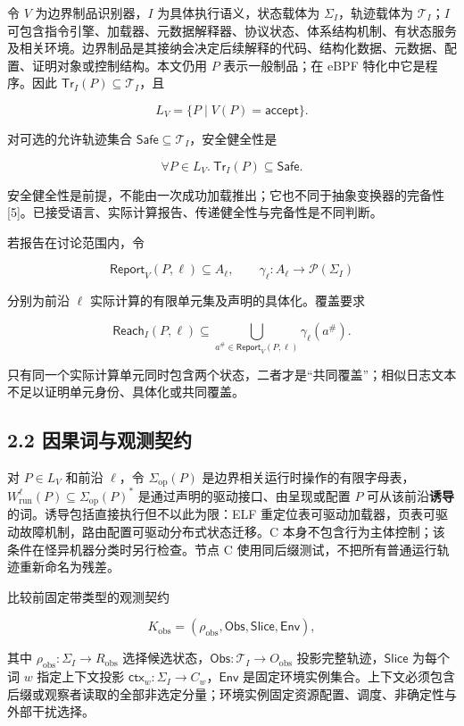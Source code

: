 \documentclass[
  11pt,
  a4paper,
]{ctexart}
\begin{document}
令 \(V\) 为边界制品识别器，\(I\) 为具体执行语义，状态载体为
\(\Sigma_I\)，轨迹载体为 \(\mathcal T_I\)；\(I\)
可包含指令引擎、加载器、元数据解释器、协议状态、体系结构机制、有状态服务及相关环境。边界制品是其接纳会决定后续解释的代码、结构化数据、元数据、配置、证明对象或控制结构。本文仍用
\(P\) 表示一般制品；在 eBPF 特化中它是程序。因此
\(\mathsf{Tr}_I(P)\subseteq\mathcal T_I\)，且

\[L_V=\{P\mid V(P)=\mathsf{accept}\}.\]

对可选的允许轨迹集合
\(\mathsf{Safe}\subseteq\mathcal T_I\)，安全健全性是

\[\forall P\in L_V.\ \mathsf{Tr}_I(P)\subseteq\mathsf{Safe}.\]

安全健全性是前提，不能由一次成功加载推出；它也不同于抽象变换器的完备性
{[}5{]}。已接受语言、实际计算报告、传递健全性与完备性是不同判断。

若报告在讨论范围内，令

\[\mathsf{Report}_V(P,\ell)\subseteq A_\ell,
\qquad \gamma_\ell:A_\ell\to\mathcal P(\Sigma_I)\]

分别为前沿 \(\ell\) 实际计算的有限单元集及声明的具体化。覆盖要求

\[\mathsf{Reach}_I(P,\ell)\subseteq
\bigcup_{a^\#\in\mathsf{Report}_V(P,\ell)}\gamma_\ell(a^\#).\]

只有同一个实际计算单元同时包含两个状态，二者才是``共同覆盖''；相似日志文本不足以证明单元身份、具体化或共同覆盖。

\hypertarget{22-ux56e0ux679cux8bcdux4e0eux89c2ux6d4bux5951ux7ea6}{%
\subsection{2.2
因果词与观测契约}\label{22-ux56e0ux679cux8bcdux4e0eux89c2ux6d4bux5951ux7ea6}}

对 \(P\in L_V\) 和前沿 \(\ell\)，令 \(\Sigma_{\mathrm{op}}(P)\)
是边界相关运行时操作的有限字母表，\(W^\ell_{\mathrm{run}}(P)\subseteq\Sigma_{\mathrm{op}}(P)^*\)
是通过声明的驱动接口、由呈现或配置 \(P\)
可从该前沿\textbf{诱导}的词。诱导包括直接执行但不以此为限：ELF
重定位表可驱动加载器，页表可驱动故障机制，路由配置可驱动分布式状态迁移。C
本身不包含行为主体控制；该条件在怪异机器分类时另行检查。节点 C
使用同后缀测试，不把所有普通运行轨迹重新命名为残差。

比较前固定带类型的观测契约

\[K_{\mathrm{obs}}=(\rho_{\mathrm{obs}},\mathsf{Obs},\mathsf{Slice},\mathsf{Env}),\]

其中 \(\rho_{\mathrm{obs}}:\Sigma_I\to R_{\mathrm{obs}}\)
选择候选状态，\(\mathsf{Obs}:\mathcal T_I\to O_{\mathrm{obs}}\)
投影完整轨迹，\(\mathsf{Slice}\) 为每个词 \(w\) 指定上下文投影
\(\mathsf{ctx}_w:\Sigma_I\to C_w\)，\(\mathsf{Env}\)
是固定环境实例集合。上下文必须包含后缀或观察者读取的全部非选定分量；环境实例固定资源配置、调度、非确定性与外部干扰选择。
\end{document}
